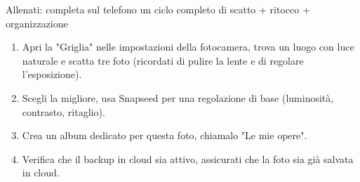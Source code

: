 \begin{tcbpractice}{Allenati: completa sul telefono un ciclo completo di scatto + ritocco + organizzazione}
\begin{enumerate}
  \item Apri la "Griglia" nelle impostazioni della fotocamera, trova un luogo con luce naturale e scatta tre foto (ricordati di pulire la lente e di regolare l'esposizione).
  \item Scegli la migliore, usa Snapseed per una regolazione di base (luminosità, contrasto, ritaglio).
  \item Crea un album dedicato per questa foto, chiamalo "Le mie opere".
  \item Verifica che il backup in cloud sia attivo, assicurati che la foto sia già salvata in cloud.
\end{enumerate}

\end{tcbpractice}
